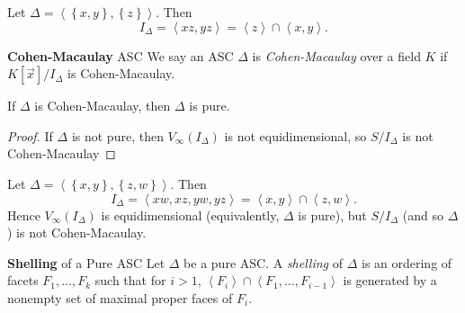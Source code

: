 \documentclass[co439]{subfiles}
\begin{document}
    \rruleline
    
    \begin{example}{}
        Let $\Delta = \left< \left\lbrace x,y \right\rbrace, \left\lbrace z \right\rbrace \right>$. Then
        \begin{equation*}
            I_{\Delta} = \left< xz,yz \right> = \left< z \right> \cap \left< x,y \right>.   
        \end{equation*}
    \end{example}

    \rruleline

    \begin{definition}{\textbf{Cohen-Macaulay} ASC}
        We say an ASC $\Delta$ is \emph{Cohen-Macaulay} over a field $K$ if $K\left[ \vec{x} \right] /I_{\Delta}$ is Cohen-Macaulay.
    \end{definition}

    \begin{lemma}{}
        If $\Delta$ is Cohen-Macaulay, then $\Delta$ is pure.
    \end{lemma}

    \begin{proof}
        If $\Delta$ is not pure, then $V_{\infty}\left( I_{\Delta} \right)$ is not equidimensional, so $S /I_{\Delta}$ is not Cohen-Macaulay
    \end{proof}
    
    \begin{example}{}
        Let $\Delta = \left< \left\lbrace x,y \right\rbrace, \left\lbrace z,w \right\rbrace \right>$. Then
        \begin{equation*}
            I_{\Delta} = \left< xw,xz,yw,yz \right> = \left< x,y \right>\cap\left< z,w \right>.   
        \end{equation*}
        Hence $V_{\infty}\left( I_{\Delta} \right)$ is equidimensional (equivalently, $\Delta$ is pure), but $S /I_{\Delta}$ (and so $\Delta$) is not Cohen-Macaulay.
    \end{example}

    \rruleline

    \begin{definition}{\textbf{Shelling} of a Pure ASC}
        Let $\Delta$ be a pure ASC. A \emph{shelling} of $\Delta$ is an ordering of facets $F_1,\ldots,F_k$ such that for $i>1$, $\left< F_i \right>\cap\left< F_1,\ldots,F_{i-1} \right>$ is generated by a nonempty set of maximal proper faces of $F_i$.  
    \end{definition}
    
\end{document}

